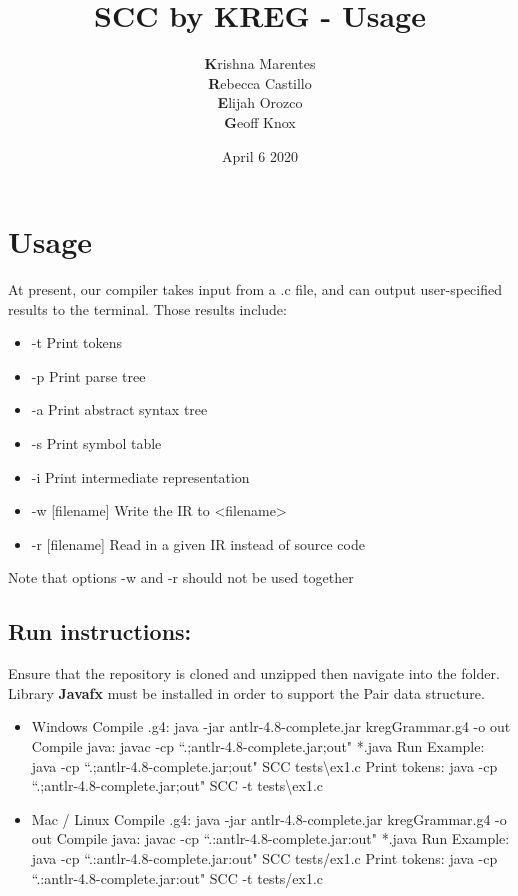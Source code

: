\documentclass{article}
\title{SCC by KREG - Usage}
\author{\textbf{K}rishna Marentes\\\textbf{R}ebecca Castillo\\\textbf{E}lijah Orozco\\\textbf{G}eoff Knox}
\date{April 6 2020}
\begin{document}
\maketitle

\section{Usage}
At present, our compiler takes input from a .c file, and can output user-specified results to the terminal. Those results include:
\begin{itemize}
    \item -t Print tokens
    \item -p Print parse tree
    \item -a Print abstract syntax tree
    \item -s Print symbol table
    \item -i Print intermediate representation
    \item -w [filename] Write the IR to <filename>
    \item -r [filename] Read in a given IR instead of source code
\end{itemize}
Note that options -w and -r should not be used together

\subsection{Run instructions:}
Ensure that the repository is cloned and unzipped then navigate into the folder.
Library \textbf{Javafx} must be installed in order to support the Pair data structure.
\begin{itemize}
    \item Windows
        \subitem Compile .g4: java -jar antlr-4.8-complete.jar kregGrammar.g4 -o out
        \subitem Compile java: javac -cp ``.;antlr-4.8-complete.jar;out" *.java
        \subitem Run Example: java -cp ``.;antlr-4.8-complete.jar;out" SCC tests\textbackslash ex1.c
        \subitem Print tokens: java -cp ``.;antlr-4.8-complete.jar;out" SCC -t tests\textbackslash ex1.c
    \item Mac / Linux
        \subitem Compile .g4: java -jar antlr-4.8-complete.jar kregGrammar.g4 -o out
        \subitem Compile java: javac -cp ``.:antlr-4.8-complete.jar:out" *.java
        \subitem Run Example: java -cp ``.:antlr-4.8-complete.jar:out" SCC tests/ex1.c
        \subitem Print tokens: java -cp ``.:antlr-4.8-complete.jar:out" SCC -t tests/ex1.c
\end{itemize}
\end{document}
